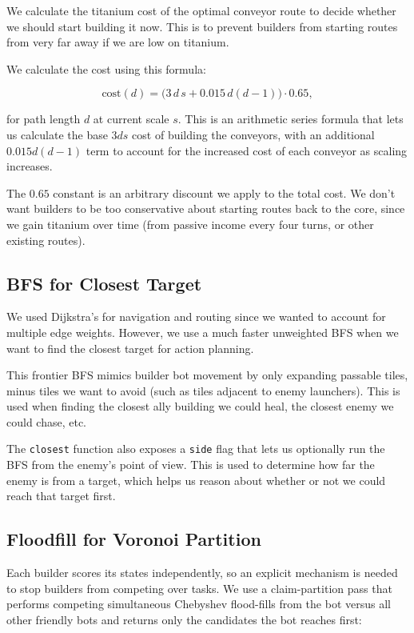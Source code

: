 \documentclass[10pt,sigconf,nonacm]{acmart}
\newcommand{\code}[1]{{%
  \def\_{\char`\_\discretionary{}{}{}}%
  \texttt{\small #1}%
}}
\begin{document}
We calculate the titanium cost of the optimal conveyor route to decide whether we should start building it now. This is to prevent builders from starting routes from very far away if we are low on titanium.

We calculate the cost using this formula:

\[
  \text{cost}(d)=\bigl(3\,d\,s + 0.015\,d(d-1)\bigr)\cdot 0.65,
\]


for path length $d$ at current scale $s$. This is an arithmetic series formula that lets us calculate the base $3ds$ cost of building the conveyors, with an additional $0.015d(d-1)$ term to account for the increased cost of each conveyor as scaling increases.

The $0.65$ constant is an arbitrary discount we apply to the total cost. We don't want builders to be too conservative about starting routes back to the core, since we gain titanium over time (from passive income every four turns, or other existing routes).

\subsection{BFS for Closest Target}

We used Dijkstra's for navigation and routing since we wanted to account for multiple edge weights. However, we use a much faster unweighted BFS when we want to find the closest target for action planning.

This frontier BFS mimics builder bot movement by only expanding passable tiles, minus tiles we want to avoid (such as tiles adjacent to enemy launchers). This is used when finding the closest ally building we could heal, the closest enemy we could chase, etc.

The \code{closest} function also exposes a \code{side} flag that lets us optionally run the BFS from the enemy's point of view. This is used to determine how far the enemy is from a target, which helps us reason about whether or not we could reach that target first.

\subsection{Floodfill for Voronoi Partition}

Each builder scores its states independently, so an explicit mechanism is
needed to stop builders from competing over tasks. We use a claim-partition pass that performs competing simultaneous Chebyshev flood-fills from the bot versus all other friendly bots and returns only the candidates the bot reaches first:
\end{document}
